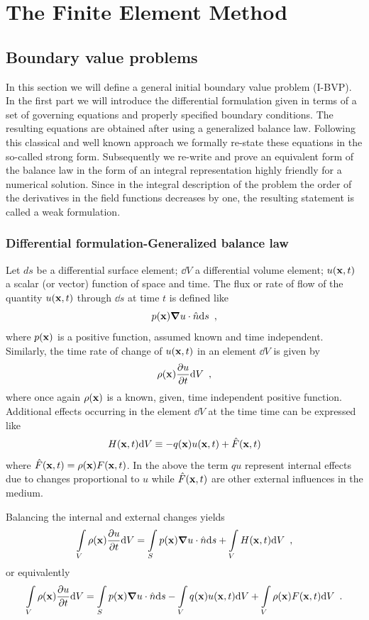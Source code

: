 \graphicspath{ {./img/TheFEM/} }
\chapter{The Finite Element Method}
\section{Boundary value problems}
In this section we will define a general initial boundary value problem (I-BVP). In the first part we will introduce the differential formulation given in terms of a set of governing equations and properly specified boundary conditions. The resulting equations are obtained after using a generalized balance law. Following this classical and well known approach we formally re-state these equations in the so-called strong form. Subsequently we re-write and prove an equivalent form of the balance law in the form of an integral representation highly friendly for a numerical solution. Since in the integral description of the problem the order of the derivatives in the field functions decreases by one, the resulting statement is called a weak formulation. 
\subsection{Differential formulation-Generalized balance law}
Let $ds$ be a differential surface element; $\dd V$ a differential volume element; $u(\vb{x},t)$ a scalar (or vector) function of space and time.
The flux or rate of flow of the quantity $u(\vb x, t)$ through $\dd s$ at time $t$ is defined like
\[p(\vb x)\grad u \cdot \hat n \dd s \enspace ,\]
where $p(\vb x)$ is a positive function, assumed known and time independent. Similarly, the time rate of change of $u(\vb x, t)$ in an element $\dd V$ is given by
\[\rho (\vb x)\pdv{u}{t} \dd V \enspace ,\]
where once again $\rho (\vb x)$ is a known, given, time independent positive function. Additional effects occurring in the element $\dd V$ at the time time can be expressed like
\[H(\vb x, t)\dd V \equiv  - q(\vb x)u(\vb x, t) + \hat F(\vb x,t)\]
where $\hat F(\vb x, t) = \rho (\vb x)F(\vb x, t)$. In the above the term $q u$ represent internal effects due to changes proportional to $u$ while $\hat F(\vb x, t)$ are other external influences in the medium.

Balancing the internal and external changes yields
\[\int\limits_V \rho (\vb x)\pdv{u}{t}\dd V = \int\limits_S p(\vb x)\vb \grad u \cdot \hat n\dd s  + \int\limits_V H(\vb x, t)\dd V \enspace ,\]
or equivalently
\[\int\limits_V \rho (\vb x)\pdv{u}{t}\dd V = \int\limits_S p(\vb x)\vb \grad u \cdot \hat n\dd s   - \int\limits_V q(\vb x)u(\vb x, t)\dd V  + \int\limits_V \rho (\vb x)F(\vb x, t)\dd V \enspace .\]

